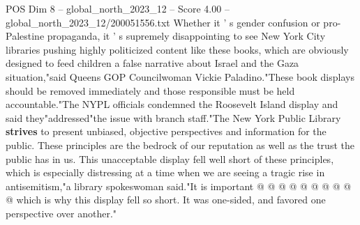 \begin{textsample}{POS Dim 8 – global\_north\_2023\_12 – Score 4.00 – global\_north\_2023\_12/200051556.txt}
Whether it ' s gender confusion or pro-Palestine propaganda, it ' s supremely disappointing to see New York City libraries pushing highly politicized content like these books, which are obviously designed to feed children a false narrative about Israel and the Gaza situation,"said Queens GOP Councilwoman Vickie Paladino."These book displays should be removed immediately and those responsible must be held accountable."The NYPL officials condemned the Roosevelt Island display and said they"addressed"the issue with branch staff."The New York Public Library \textbf{strives} to present unbiased, objective perspectives and information for the public.
These principles are the bedrock of our reputation as well as the trust the public has in us.
This unacceptable display fell well short of these principles, which is especially distressing at a time when we are seeing a tragic rise in antisemitism,"a library spokeswoman said."It is important @ @ @ @ @ @ @ @ @ @ which is why this display fell so short.
It was one-sided, and favored one perspective over another."

\end{textsample}
